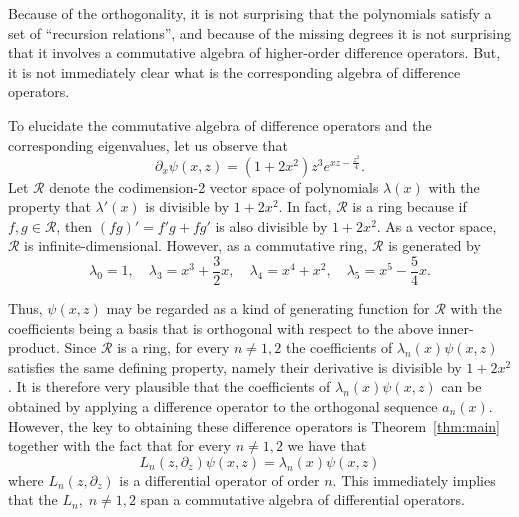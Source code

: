 \documentclass{amsart}
\theoremstyle{definition}
\theoremstyle{remark}
\numberwithin{equation}{section}
\def\R{\mathcal{R}}
\begin{document}
Because of the orthogonality, it is not surprising that the
polynomials satisfy a set of ``recursion relations'', and because of
the missing degrees it is not surprising that it involves a
commutative algebra of higher-order difference operators.  But, it is
not immediately clear what is the corresponding algebra of difference
operators.

To elucidate the commutative algebra of difference operators and the
corresponding eigenvalues, let us observe that
\[ \partial_x \psi(x,z) = (1+2x^2)z^3 e^{xz-\frac{z^2}4}.\] Let $\R$
denote the codimension-2 vector space of polynomials $\lambda(x)$ with
the property that $\lambda'(x)$ is divisible by $1+2x^2$.  In fact,
$\R$ is a ring because if $f,g\in\R$, then $(fg)' = f' g + f g'$ is
also divisible by $1+2x^2$.  As a vector space, $\R$ is
infinite-dimensional.  However, as a commutative ring, $\R$ is
generated by
\[ \lambda_0 = 1, \quad \lambda_3 = x^3+\frac32 x,\quad
  \lambda_4 = x^4+x^2,\quad \lambda_5 =  x^5 -\frac54 x.\]

Thus, $\psi(x,z)$ may be regarded as a kind of generating function for
$\R$ with the coefficients being a basis that is orthogonal with
respect to the above inner-product.  Since $\R$ is a ring, for every
$n\ne 1,2$ the coefficients of $\lambda_n(x) \psi(x,z)$ satisfies the
same defining property, namely their derivative is divisible by
$1+2x^2$.   It is therefore very plausible that the coefficients of
$\lambda_n(x) \psi(x,z)$ can be obtained by applying a difference
operator to the orthogonal sequence $a_n(x)$.   However, the key to
obtaining these difference operators is
Theorem~\ref{thm:main} together with the fact
that for every $n\ne 1,2$ we have that
\[ L_n(z,\partial_z)\psi(x,z) = \lambda_n(x) \psi(x,z) \] where
$L_n(z,\partial_z)$ is a differential operator of order $n$.  This
immediately implies that the $L_n,\; n\ne 1,2$ span a commutative
algebra of differential operators.
\end{document}
